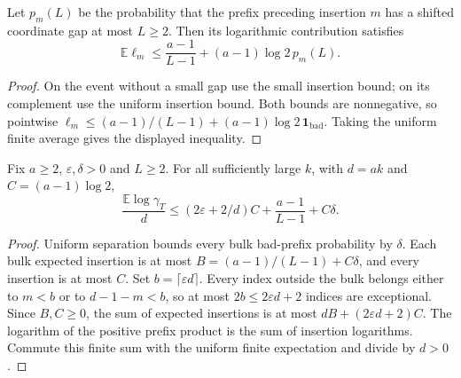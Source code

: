 \begin{lemma}
\label{lem:expected-log-insertion}
\leanok
Let $p_m(L)$ be the probability that the prefix preceding insertion
$m$ has a shifted coordinate gap at most $L\geq2$.
Then its logarithmic contribution satisfies
\[
 \mathbb E\ell_m\leq \frac{a-1}{L-1}+(a-1)\log2\,p_m(L).
\]
\end{lemma}
\begin{proof}
On the event without a small gap use the small insertion bound;
on its complement use the uniform insertion bound. Both bounds
are nonnegative, so pointwise
$\ell_m\leq(a-1)/(L-1)+(a-1)\log2\,\mathbf1_{\mathrm{bad}}$.
Taking the uniform finite
average gives the displayed inequality.
\end{proof}

\begin{lemma}
\label{lem:total-log-average}
\leanok
Fix $a\geq2$, $\varepsilon,\delta>0$ and $L\geq2$.
For all sufficiently large $k$, with $d=ak$ and $C=(a-1)\log2$,
\[
 \frac{\mathbb E\log\gamma_T}{d}
 \leq(2\varepsilon+2/d)C+\frac{a-1}{L-1}+C\delta.
\]
\end{lemma}
\begin{proof}
Uniform separation bounds every bulk bad-prefix probability by $\delta$.
Each bulk expected insertion is at most $B=(a-1)/(L-1)+C\delta$,
and every insertion is at most $C$. Set $b=\lceil\varepsilon d\rceil$.
Every index outside the bulk belongs either to $m<b$ or to
$d-1-m<b$, so at most $2b\leq2\varepsilon d+2$ indices are exceptional.
Since $B,C\geq0$, the sum of expected insertions is at most
$dB+(2\varepsilon d+2)C$. The logarithm of the positive prefix product
is the sum of insertion logarithms. Commute this finite sum with the
uniform finite expectation and divide by $d>0$.
\end{proof}

